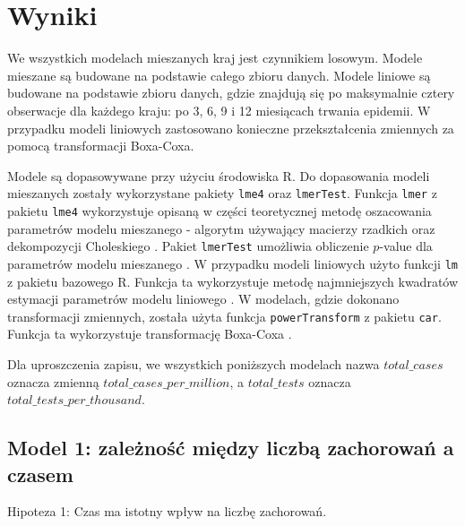 \documentclass[12pt]{mwbk}
\theoremstyle{plain}
\theoremstyle{definition}
\theoremstyle{remark}
\newcommand\zrodlo[1]{\par\vspace{-3mm}{\small\textit{Źródło: }#1 }}
\begin{document}
 



\section{Wyniki}

We wszystkich modelach mieszanych kraj jest czynnikiem losowym. Modele mieszane są budowane na podstawie całego zbioru danych. Modele liniowe są budowane na podstawie zbioru danych, gdzie znajdują się po maksymalnie cztery obserwacje dla każdego kraju: po 3, 6, 9 i 12 miesiącach trwania epidemii. W przypadku modeli liniowych zastosowano konieczne przekształcenia zmiennych za pomocą transformacji Boxa-Coxa.

Modele są dopasowywane przy użyciu środowiska R. Do dopasowania modeli mieszanych zostały wykorzystane pakiety \texttt{lme4} oraz \texttt{lmerTest}. Funkcja \texttt{lmer} z pakietu \texttt{lme4} wykorzystuje opisaną w części teoretycznej metodę oszacowania parametrów modelu mieszanego - algorytm używający macierzy rzadkich oraz dekompozycji Choleskiego \cite{lme4}. Pakiet \texttt{lmerTest} umożliwia obliczenie $p$-value dla parametrów modelu mieszanego \cite{lmerTest}. W przypadku modeli liniowych użyto funkcji \texttt{lm} z pakietu bazowego R. Funkcja ta wykorzystuje metodę najmniejszych kwadratów estymacji parametrów modelu liniowego \cite{lm}. W modelach, gdzie dokonano transformacji zmiennych, została użyta funkcja \texttt{powerTransform} z pakietu \texttt{car}. Funkcja ta wykorzystuje transformację Boxa-Coxa \cite{powerTransform}.

Dla uproszczenia zapisu, we wszystkich poniższych modelach nazwa $total\_cases$ oznacza zmienną $total\_cases\_per\_million$, a $total\_tests$ oznacza \\$total\_tests\_per\_thousand$.

\subsection{Model 1: zależność między liczbą zachorowań a czasem}

Hipoteza 1: Czas ma istotny wpływ na liczbę zachorowań.
\end{document}
